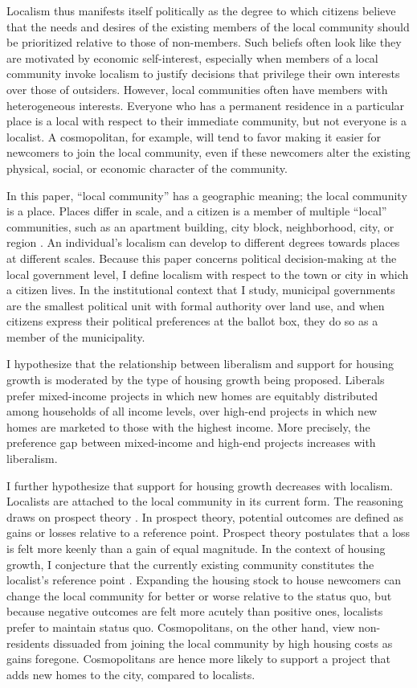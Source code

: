 \documentclass[article,11pt]{memoir}
\begin{document}
Localism thus manifests itself politically as the degree to which citizens believe that the needs and desires of the existing members of the local community should be prioritized relative to those of non-members.  Such beliefs often look like they are motivated by economic self-interest, especially when members of a local community invoke localism to justify decisions that privilege their own interests over those of outsiders.  However, local communities often have members with heterogeneous interests. Everyone who has a permanent residence in a particular place is a local with respect to their immediate community, but not everyone is a localist. A cosmopolitan, for example, will tend to favor making it easier for newcomers to join the local community, even if these newcomers alter the existing physical, social, or economic character of the community.

In this paper, ``local community'' has a geographic meaning; the local community is a place.  Places differ in scale, and a citizen is a member of multiple ``local'' communities, such as an apartment building, city block, neighborhood, city, or region \citep{hidalgo_place_2001,lewicka_what_2010}.  An individual's localism can develop to different degrees towards places at different scales.  Because this paper concerns political decision-making at the local government level, I define localism with respect to the town or city in which a citizen lives.  In the institutional context that I study, municipal governments are the smallest political unit with formal authority over land use, and when citizens express their political preferences at the ballot box, they do so as a member of the municipality.

I hypothesize that the relationship between liberalism and support for housing growth is moderated by the type of housing growth being proposed. Liberals prefer mixed-income projects in which new homes are equitably distributed among households of all income levels, over high-end projects in which new homes are marketed to those with the highest income.  More precisely, the preference gap between mixed-income and high-end projects increases with liberalism.

I further hypothesize that support for housing growth decreases with localism. Localists are attached to the local community in its current form. The reasoning draws on prospect theory \citep{kahneman_prospect_1979}. In prospect theory, potential outcomes are defined as gains or losses relative to a reference point. Prospect theory postulates that a loss is felt more keenly than a gain of equal magnitude. In the context of housing growth, I conjecture that the currently existing community constitutes the localist's reference point . Expanding the housing stock to house newcomers can change the local community for better or worse relative to the status quo, but because negative outcomes are felt more acutely than positive ones, localists prefer to maintain status quo. Cosmopolitans, on the other hand, view non-residents dissuaded from joining the local community by high housing costs as gains foregone. Cosmopolitans are hence more likely to support a project that adds new homes to the city, compared to localists.
\end{document}
